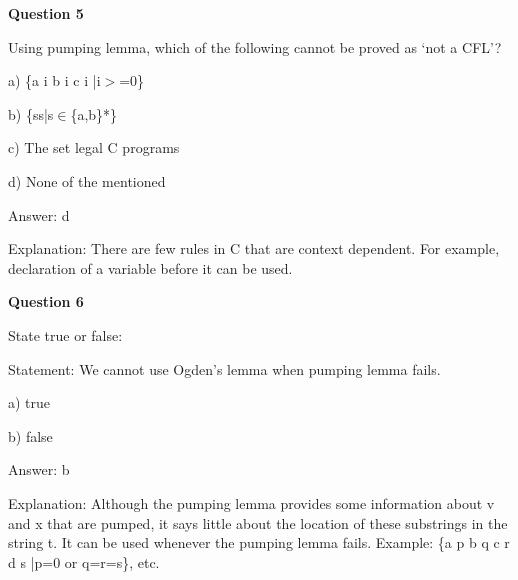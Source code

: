 \documentclass{article}
\begin{document}
\begin{mdframed}[linewidth=1pt, roundcorner=5pt, linecolor=gray!30, backgroundcolor=gray!5]
\textbf{Question 5} 

Using pumping lemma, which of the following cannot be proved as ‘not a CFL'?

a) \{a
i
b
i
c
i
|i$>$=0\}

b) \{ss|s$\in$\{a,b\}*\}

c) The set legal C programs

d) None of the mentioned
\vspace{5pt} \par
\begin{tcolorbox}[colback=green!5, colframe=green!40!black, title=Solution]
Answer: d

Explanation: There are few rules in C that are context dependent. For example, declaration of a variable before it can be used.
\end{tcolorbox}
\end{mdframed}

\begin{mdframed}[linewidth=1pt, roundcorner=5pt, linecolor=gray!30, backgroundcolor=gray!5]
\textbf{Question 6} 

State true or false:

Statement: We cannot use Ogden's lemma when pumping lemma fails.

a) true

b) false
\vspace{5pt} \par
\begin{tcolorbox}[colback=green!5, colframe=green!40!black, title=Solution]
Answer: b

Explanation: Although the pumping lemma provides some information about v and x that are pumped, it says little about the location of these substrings in the string t. It can be used whenever the pumping lemma fails. Example: \{a
p
b
q
c
r
d
s
|p=0 or q=r=s\}, etc.
\end{tcolorbox}
\end{mdframed}
\newpage
\end{document}
